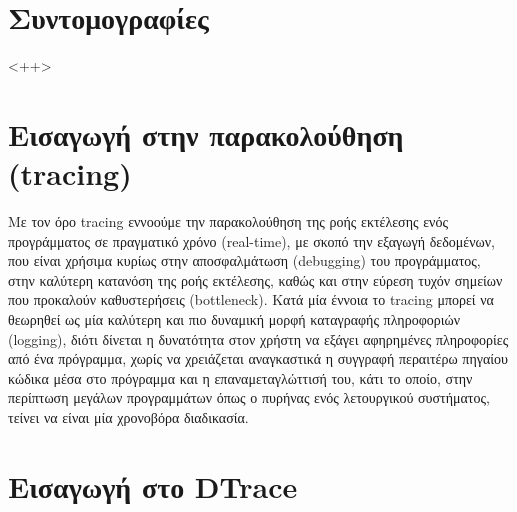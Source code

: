 \documentclass[12pt]{article}
\begin{document}
\section{Συντομογραφίες}

<++>

\section{Εισαγωγή στην παρακολούθηση (tracing)}

Με τον όρο tracing εννοούμε την παρακολούθηση της ροής εκτέλεσης ενός
προγράμματος σε πραγματικό χρόνο (real-time), με σκοπό την εξαγωγή δεδομένων,
που είναι χρήσιμα κυρίως στην αποσφαλμάτωση (debugging) του προγράμματος, στην
καλύτερη κατανόση της ροής εκτέλεσης, καθώς και στην εύρεση τυχόν σημείων που
προκαλούν καθυστερήσεις (bottleneck). Κατά μία έννοια το tracing μπορεί να
θεωρηθεί ως μία καλύτερη και πιο δυναμική μορφή καταγραφής πληροφοριών
(logging), διότι δίνεται η δυνατότητα στον χρήστη να εξάγει αφηρημένες
πληροφορίες από ένα πρόγραμμα, χωρίς να χρειάζεται αναγκαστικά η συγγραφή
περαιτέρω πηγαίου κώδικα μέσα στο πρόγραμμα και η επαναμεταγλώττισή του, κάτι
το οποίο, στην περίπτωση μεγάλων προγραμμάτων όπως ο πυρήνας ενός λετουργικού
συστήματος, τείνει να είναι μία χρονοβόρα διαδικασία.


\section{Εισαγωγή στο DTrace}

%
\end{document}
